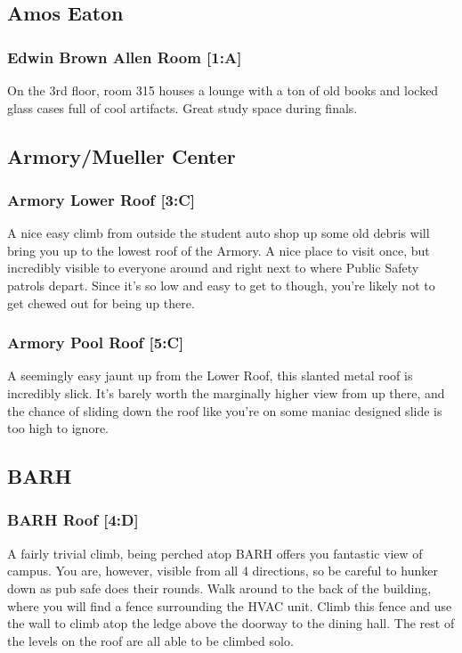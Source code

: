 \documentclass{article}
\begin{document}
\pagebreak
\subsection{Amos Eaton}
\subsubsection{Edwin Brown Allen Room [1:A]}
On the 3rd floor, room 315 houses a lounge with a ton of old books and locked glass cases full of cool artifacts. Great study space during finals.



\pagebreak
\subsection{Armory/Mueller Center}
\subsubsection{Armory Lower Roof [3:C]}
A nice easy climb from outside the student auto shop up some old debris will bring you up to the lowest roof of the Armory. A nice place to visit once, but incredibly visible to everyone around and right next to where Public Safety patrols depart. Since it’s so low and easy to get to though, you’re likely not to get chewed out for being up there.
\subsubsection{Armory Pool Roof [5:C]}
A seemingly easy jaunt up from the Lower Roof, this slanted metal roof is incredibly slick. It’s barely worth the marginally higher view from up there, and the chance of sliding down the roof like you’re on some maniac designed slide is too high to ignore.
\pagebreak

\subsection{BARH}
\subsubsection{BARH Roof [4:D]}
A fairly trivial climb, being perched atop BARH offers you fantastic view of campus. You are, however, visible from all 4 directions, so be careful to hunker down as pub safe does their rounds. Walk around to the back of the building, where you will find a fence surrounding the HVAC unit. Climb this fence and use the wall to climb atop the ledge above the doorway to the dining hall. The rest of the levels on the roof are all able to be climbed solo.
\end{document}
